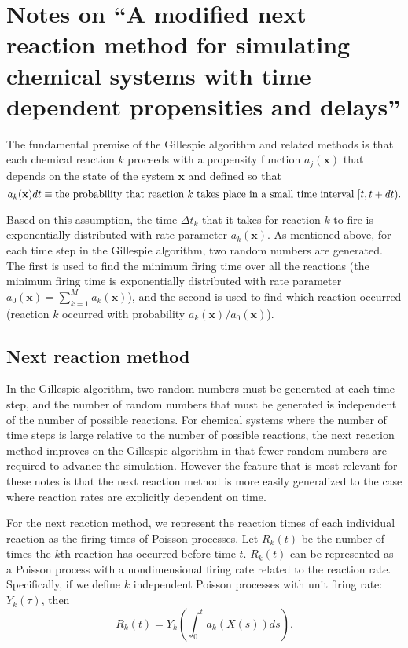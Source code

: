 \documentclass{article}
\newcommand{\dd}{d}
\newcommand{\tn}{\textnormal}
\begin{document}
\section{Notes on ``A modified next reaction method for simulating
  chemical systems with time dependent propensities and delays''}
\label{sec:notes-modified-nrm}

The fundamental premise of the Gillespie algorithm and related methods
\cite{Gillespie2007} is that each chemical reaction $k$ proceeds with
a propensity function $a_j(\mathbf{x})$ that depends on the state of
the system $\mathbf{x}$ and defined so that
\begin{equation}
  \label{eq:prop-def}
  a_k(\mathbf{x}) \dd t \equiv \tn{the probability that reaction $k$
    takes place in a small time interval $[t, t+\dd t)$}.
\end{equation}

Based on this assumption, the time $\Delta t_k$ that it takes for
reaction $k$ to fire is exponentially distributed with rate parameter
$a_k(\mathbf{x})$. As mentioned above, for each time step in the
Gillespie algorithm, two random numbers are generated. The first is
used to find the minimum firing time over all the reactions (the
minimum firing time is exponentially distributed with rate parameter
$a_0(\mathbf{x}) = \sum_{k=1}^M a_k(\mathbf{x})$), and the second is
used to find which reaction occurred (reaction $k$ occurred with
probability $a_k(\mathbf{x}) / a_0 (\mathbf{x})$).

\subsection{Next reaction method}
\label{sec:next-reaction-method}

In the Gillespie algorithm, two random numbers must be generated at
each time step, and the number of random numbers that must be
generated is independent of the number of possible reactions. For
chemical systems where the number of time steps is large relative to
the number of possible reactions, the next reaction method improves on
the Gillespie algorithm in that fewer random numbers are required to
advance the simulation. However the feature that is most relevant for
these notes is that the next reaction method is more easily
generalized to the case where reaction rates are explicitly dependent
on time.

For the next reaction method, we represent the reaction times of each
individual reaction as the firing times of Poisson processes. Let
$R_k(t)$ be the number of times the $k$th reaction has occurred before
time $t$. $R_k(t)$ can be represented as a Poisson process with a
nondimensional firing rate related to the reaction rate. Specifically,
if we define $k$ independent Poisson processes with unit firing rate:
$Y_k(\tau)$, then
\begin{equation}
  \label{eq:R-def}
  R_k(t) = Y_k\left(\int_0^t a_k(X(s)) ds \right).
\end{equation}
\end{document}
